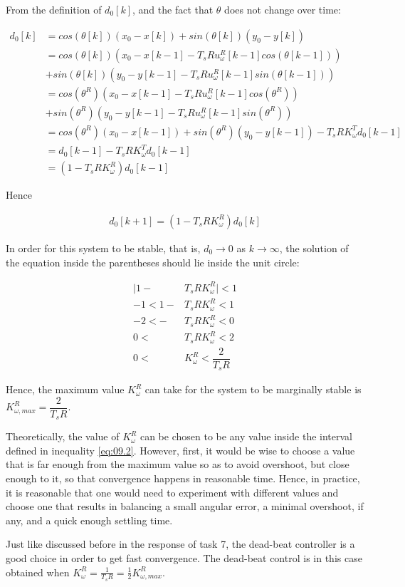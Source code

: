 From the definition of $d_0[k]$, and the fact that $\theta$ does not
change over time:

\begin{align*}
  d_0[k] &= cos(\theta[k]) (x_0 - x[k]) + sin(\theta[k]) (y_0 - y[k]) \\
         &= cos(\theta[k]) (x_0 - x[k-1] - T_s R u_{\omega}^R[k-1] cos(\theta[k-1])) \\
         &+ sin(\theta[k]) (y_0 - y[k-1] - T_s R u_{\omega}^R[k-1] sin(\theta[k-1])) \\
         &= cos(\theta^R) (x_0 - x[k-1] - T_s R u_{\omega}^R[k-1] cos(\theta^R)) \\
         &+ sin(\theta^R) (y_0 - y[k-1] - T_s R u_{\omega}^R[k-1] sin(\theta^R)) \\
         &= cos(\theta^R) (x_0 - x[k-1]) + sin(\theta^R) (y_0 - y[k-1]) -T_s R K_{\omega}^T d_0[k-1]  \\
         &= d_0[k-1] - T_s R K_{\omega}^T d_0[k-1]  \\
         &= (1-T_s R K_{\omega}^R)d_0[k-1]
\end{align*}

Hence

\begin{align*}
  d_0[k+1]= (1-T_s R K_{\omega}^R)d_0[k]
\end{align*}

In order for this system to be stable, that is, $d_0 \to 0$ as $k \to \infty$,
the solution of the equation inside the parentheses should lie inside the unit
circle:

\begin{align}
  \Big|1 - &T_s R K_{\omega}^R\Big| < 1 \nonumber \\
  -1 < 1 - &T_s R K_{\omega}^R < 1 \nonumber \\
  -2 < - &T_s R K_{\omega}^R < 0 \nonumber \\
   0 <\ &T_s R K_{\omega}^R < 2 \nonumber \\
   0 <\ &K_{\omega}^R < \dfrac{2}{T_s R} \label{eq:09.2}
\end{align}

Hence, the maximum value $K_{\omega}^R$ can take for the system to be marginally
stable is $K_{\omega,max}^R = \dfrac{2}{T_s R}$.

Theoretically, the value of $K_{\omega}^R$ can be chosen to be any value inside
the interval defined in inequality \ref{eq:09.2}. However, first, it would be
wise to choose a value that is far enough from the maximum value so as to avoid
overshoot, but close enough to it, so that convergence happens in reasonable
time. Hence, in practice, it is reasonable that one would need to experiment
with different values and choose one that results in balancing a small angular
error, a minimal overshoot, if any, and a quick enough settling time.

Just like discussed before in the response of task 7, the dead-beat controller
is a good choice in order to get fast convergence. The dead-beat control is in
this case obtained when $K_\omega ^R = \frac{1}{T_s R} = \frac{1}{2}K_{\omega,max}^R$.
